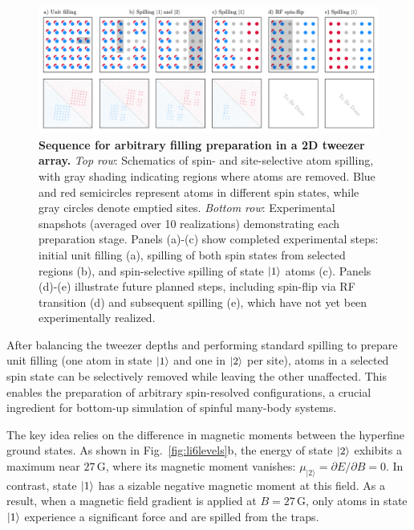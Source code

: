
\begin{figure}
    \centering
    \includegraphics{fig-ai/preparation-array-ai.pdf}
    \caption{
    \textbf{Sequence for arbitrary filling preparation in a 2D tweezer array.}
    \textit{Top row}: Schematics of spin- and site-selective atom spilling, with gray shading indicating regions where atoms are removed. Blue and red semicircles represent atoms in different spin states, while gray circles denote emptied sites.
    \textit{Bottom row}: Experimental snapshots (averaged over 10 realizations) demonstrating each preparation stage. Panels (a)-(c) show completed experimental steps: initial unit filling (a), spilling of both spin states from selected regions (b), and spin-selective spilling of state $\left| 1 \right\rangle$ atoms (c). Panels (d)-(e) illustrate future planned steps, including spin-flip via RF transition (d) and subsequent spilling (e), which have not yet been experimentally realized.
    }
    \label{fig:preparation-array}
\end{figure}




After balancing the tweezer depths and performing standard spilling to prepare unit filling (one atom in state $\left| 1 \right\rangle$ and one in $\left| 2 \right\rangle$ per site), atoms in a selected spin state can be selectively removed while leaving the other unaffected. This enables the preparation of arbitrary spin-resolved configurations, a crucial ingredient for bottom-up simulation of spinful many-body systems.

The key idea relies on the difference in magnetic moments between the hyperfine ground states. As shown in Fig.~\ref{fig:li6levels}b, the energy of state $\left| 2 \right\rangle$ exhibits a maximum near $27\,\mathrm{G}$, where its magnetic moment vanishes: $\mu_{|2\rangle} = \partial E / \partial B = 0$. In contrast, state $\left| 1 \right\rangle$ has a sizable negative magnetic moment at this field.
As a result, when a magnetic field gradient is applied at $B = 27\,\mathrm{G}$, only atoms in state $\left| 1 \right\rangle$ experience a significant force and are spilled from the traps.

